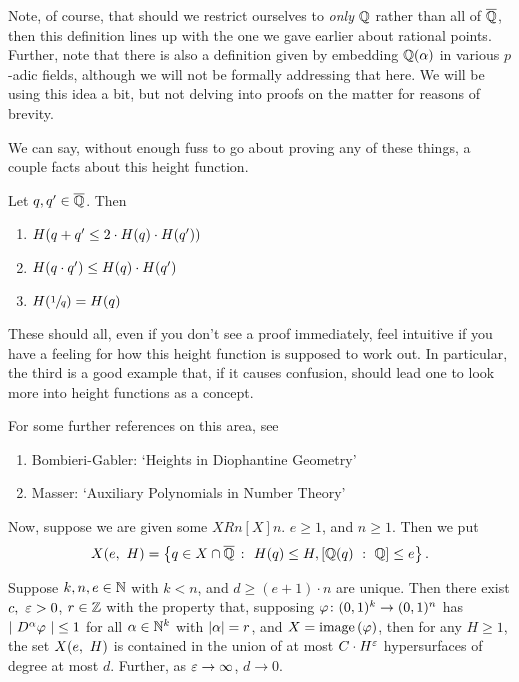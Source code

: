 \begin{remark}
  Note, of course, that should we restrict ourselves to \emph{only} $\Q$ rather than all of $\Qbar$, then this definition lines up with the one we gave earlier about rational points. Further, note that there is also a definition given by embedding $\Q(\alpha)$ in various $p$-adic fields, although we will not be formally addressing that here. We will be using this idea a bit, but not delving into proofs on the matter for reasons of brevity.
\end{remark}

We can say, without enough fuss to go about proving any of these things, a couple facts about this height function.

\begin{proposition}
  Let $q, \pri{q} \in \Qbar$. Then
    \begin{enumerate}
      \item $H(q + \pri{q} \leq 2 \cdot H(q) \cdot H(\pri{q}))$
      \item $H(q \cdot \pri{q}) \leq H(q) \cdot H(\pri{q})$
      \item $H(\sfrac{1}{q}) = H(q)$
    \end{enumerate}
    These should all, even if you don't see a proof immediately, feel intuitive if you have a feeling for how this height function is supposed to work out. In particular, the third is a good example that, if it causes confusion, should lead one to look more into height functions as a concept.
\end{proposition}

For some further references on this area, see
\begin{enumerate}
  \item Bombieri-Gabler: `Heights in Diophantine Geometry'
  \item Masser: `Auxiliary Polynomials in Number Theory'
\end{enumerate}


Now, suppose we are given some $XRn[X]{n}$. $e \geq 1$, and $n \geq 1$. Then we put
  \begin{align*}
    \XeH{e} = \left\{ q \in X \cap \Qbar \ \colon \ H(q) \leq H, [\Q(q) \ : \ \Q] \leq e \right\}.
  \end{align*}

\begin{proposition}
    Suppose $k, n, e \in \N$ with $k < n$, and $d \geq (e + 1) \cdot n$ are unique. Then there exist $c, \ \eps > 0$, $r \in \Z$ with the property that, supposing $\funcdom{\phi}{(0, 1)^k}{(0, 1)^n}$ has $\lvrv{D^{\alpha} \phi } \leq 1$ for all $\alpha \in \N^k$ with $\norm{\alpha} = r$, and $X = \image{\phi}$, then for any $H \geq 1$, the set $\XeH[H]{e}$ is contained in the union of at most $C \cdot H^{\eps}$ hypersurfaces of degree at most $d$. Further, as $\eps \to \infty$, $d \to 0$.
    \label{prop:dioph}
\end{proposition}

